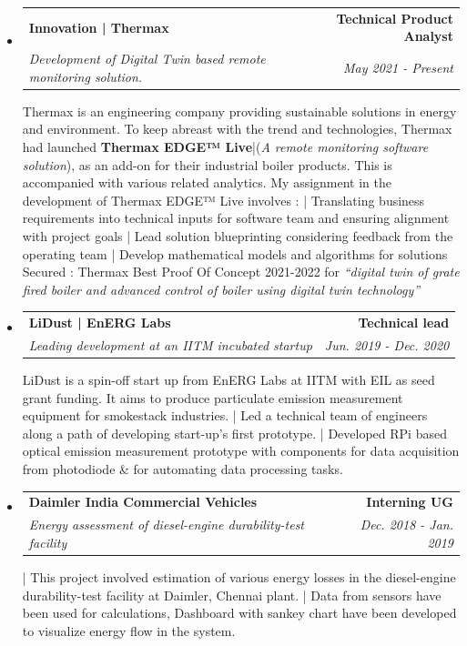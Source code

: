 \documentclass[letterpaper,11pt]{article}
\makeatletter
\newlength{\outerbordwidth}
\newcommand{\resheading}[1]{\vspace{8pt}
  \parbox{\textwidth}{\setlength{\FrameSep}{\outerbordwidth}
    \begin{shaded}
\setlength{\fboxsep}{0pt}\framebox[\textwidth][l]{\setlength{\fboxsep}{4pt}\fcolorbox{shadecolorB}{shadecolorB}{\textbf{\sffamily{\mbox{~}\makebox[6.762in][l]{\large #1} \vphantom{p\^{E}}}}}}
    \end{shaded}
  }\vspace{-5pt}
}
\newcommand{\ressubheading}[4]{
\begin{tabular*}{6.5in}{l@{\cftdotfill{\cftsecdotsep}\extracolsep{\fill}}r}
		\textbf{#1} & \textbf{#2} \\
		\textit{#3} & \textit{#4} \\
\end{tabular*}\vspace{-6pt}}
\makeatother
\begin{document}
\resheading{Experience}
\begin{itemize}
\item 
    \ressubheading{Innovation | Thermax}{Technical Product Analyst}{Development of Digital Twin based remote monitoring solution.}{May 2021 - Present}
	\newline \newline Thermax is an engineering company providing sustainable solutions in energy and environment. To keep abreast with the trend and technologies, Thermax had launched \newline \textbf{Thermax EDGE™ Live}|(\textit{A remote monitoring software solution}), as an add-on for their industrial boiler products. This is accompanied with various related analytics. 
	\newline My assignment in the development of Thermax EDGE™ Live involves : 
	\newline | Translating business requirements into technical inputs for software team and ensuring alignment with project goals
	\newline | Lead solution blueprinting considering feedback from the operating team
	\newline | Develop mathematical models and algorithms for solutions
	\newline Secured : Thermax Best Proof Of Concept 2021-2022 for \textit{``digital twin of grate fired boiler and advanced control of boiler using digital twin technology''}
	
\item
	\ressubheading{LiDust | EnERG Labs}{Technical lead}{Leading development at an IITM incubated startup}{Jun. 2019 - Dec. 2020}
	\newline \newline LiDust is a spin-off start up from EnERG Labs at IITM with EIL as seed grant funding. 
	It aims to produce particulate emission measurement equipment for smokestack industries.
	\newline | Led a technical team of engineers along a path of developing start-up's first prototype.
	\newline | Developed RPi based optical emission measurement prototype with components for data acquisition from photodiode \& for automating data processing tasks. 
\item
	\ressubheading{Daimler India Commercial Vehicles}{Interning UG}{Energy assessment of diesel-engine durability-test facility}{Dec. 2018 - Jan. 2019}
	\newline \newline | This project involved estimation of various energy losses in the diesel-engine durability-test facility at Daimler, Chennai plant.
	\newline | Data from sensors have been used for calculations, Dashboard with sankey chart have been developed to visualize energy flow in the system.
\end{itemize}
\end{document}
